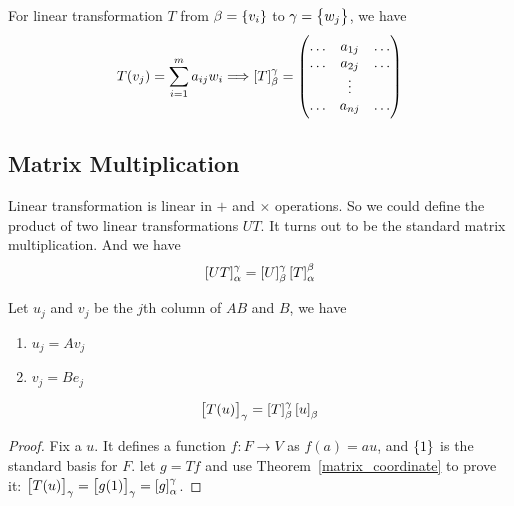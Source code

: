 For linear transformation $T$ from $\beta = \set{v_i} $ to $\gamma = \set{w_j}$, we have 
\begin{equation}
    T(v_j) = \sum_{i=1}^m a_{ij} w_i \Longrightarrow \coordinate{T}_{\beta}^{\gamma} = \begin{pmatrix}
        \hdots & a_{1j} & \hdots \\
        \hdots & a_{2j} & \hdots \\
        & \vdots \\
        \hdots & a_{nj} & \hdots \\
    \end{pmatrix}
\end{equation}



\subsection{Matrix Multiplication}

Linear transformation is linear in $+$ and $\times$ operations. So we could define the product of two linear transformations $UT$. It turns out to be the standard matrix multiplication. And we have
\begin{equation}\label{matrix_coordinate}
    \coordinate{UT}_{\alpha}^{\gamma} = \coordinate{U}_{\beta}^{\gamma} \coordinate{T}_{\alpha}^{\beta}
\end{equation}

Let $u_j$ and $v_j$ be the $j$th column of $AB$ and $B$, we have
\begin{enumerate}
    \item $u_j = A v_j$
    \item $v_j = B e_j$
\end{enumerate}

\begin{theorem}
    \begin{equation}
        \coordinate{T(u)}_\gamma = \coordinate{T}_{\beta}^{\gamma} \coordinate{u}_{\beta}
    \end{equation}    
\end{theorem}
\begin{proof}
    Fix a $u$. It defines a function $f: F \rightarrow V$ as $f(a) = au$, and $\set{1}$ is the standard basis for $F$. let $g=Tf$ and use Theorem~\ref{matrix_coordinate} to prove it: $\coordinate{T(u)}_\gamma = \coordinate{g(1)}_\gamma = \coordinate{g}_{\alpha}^{\gamma}$.
\end{proof}

